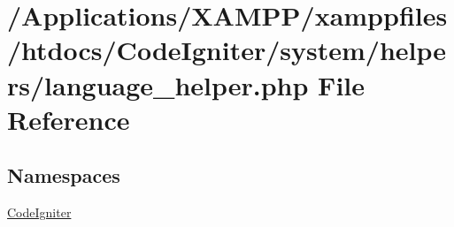 \hypertarget{language__helper_8php}{}\section{/\+Applications/\+X\+A\+M\+P\+P/xamppfiles/htdocs/\+Code\+Igniter/system/helpers/language\+\_\+helper.php File Reference}
\label{language__helper_8php}
\subsection*{Namespaces}
\begin{DoxyCompactItemize}
\item 
 \mbox{\hyperlink{namespace_code_igniter}{Code\+Igniter}}
\end{DoxyCompactItemize}
